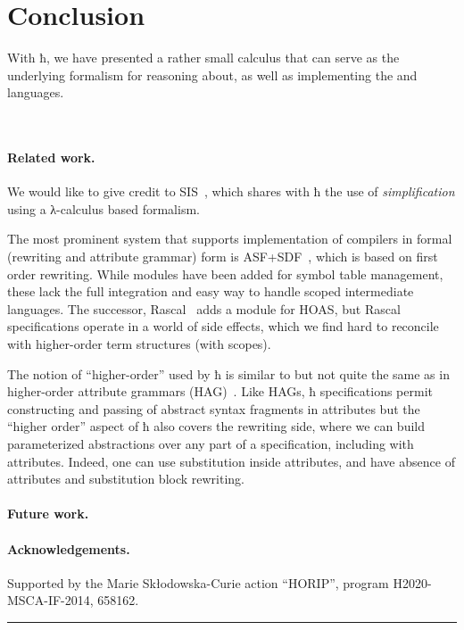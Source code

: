 \documentclass[letterpaper,10pt]{proc}
\begin{document}



\section{Conclusion}
\label{sec:conc}

With ħ, we have presented a rather small calculus that can serve as the underlying formalism for
reasoning about, as well as implementing the \CRSX and \HAX languages.


~\cite{Knuth:mst1968} 
~\cite{Aho+:2006}


\paragraph*{Related work.}

We would like to give credit to SIS~\cite{Mosses:daimi1979}, which shares with ħ the use of
\emph{simplification} using a λ-calculus based formalism.

The most prominent system that supports implementation of compilers in formal (rewriting and
attribute grammar) form is ASF+SDF~\cite{Brand+:toplas2002}, which is based on first order
rewriting. While modules have been added for symbol table management, these lack the full
integration and easy way to handle scoped intermediate languages. The successor,
Rascal~\cite{Bos+:eptcs2011} adds a module for HOAS, but Rascal specifications operate in a world of
side effects, which we find hard to reconcile with higher-order term structures (with scopes).

The notion of ``higher-order'' used by ħ is similar to but not quite the same as in higher-order
attribute grammars (HAG)~\cite{VogtSwierstraKuiper:pldi1989}. Like HAGs, ħ specifications permit
constructing and passing of abstract syntax fragments in attributes but the ``higher order'' aspect
of ħ also covers the rewriting side, where we can build parameterized abstractions over any part
of a specification, including with attributes. Indeed, one can use substitution inside attributes,
and have absence of attributes and substitution block rewriting.

\paragraph*{Future work.} 


\paragraph*{Acknowledgements.} 

Supported by the Marie Sk{\l}odowska-Curie action ``HORIP'', program
H2020-MSCA-IF-2014, 658162.






\hrule
\vspace*{1pc}
\end{document}
